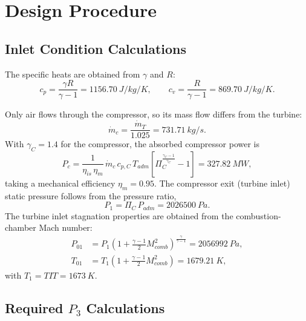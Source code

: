 \section{Design Procedure}

\subsection{Inlet Condition Calculations}

The specific heats are obtained from $\gamma$ and $R$:
\begin{equation}
    c_p = \frac{\gamma R}{\gamma-1} = \SI{1156.70}{J/kg/K},\qquad
    c_v = \frac{R}{\gamma-1} = \SI{869.70}{J/kg/K}.
\end{equation}

Only air flows through the compressor, so its mass flow differs from the turbine:
\begin{equation}
    \dot m_c = \frac{\dot m_T}{1.025} = \SI{731.71}{kg/s}.
\end{equation}
With $\gamma_C = 1.4$ for the compressor, the absorbed compressor power is
\begin{equation}
    P_c = \frac{1}{\eta_{is}\,\eta_m}\,\dot m_c\,c_{p,C}\,T_{adm}
          \left[\Pi_C^{\frac{\gamma_C-1}{\gamma_C}}-1\right] = \SI{327.82}{MW},
\end{equation}
taking a mechanical efficiency $\eta_m = 0.95$. The compressor exit (turbine
inlet) static pressure follows from the pressure ratio,
\begin{equation}
    P_1 = \Pi_C \, P_{adm} = \SI{2026500}{Pa}.
\end{equation}
The turbine inlet stagnation properties are obtained from the combustion-chamber
Mach number:
\begin{align}
    P_{01} &= P_1\left(1+\tfrac{\gamma-1}{2}M_{comb}^2\right)^{\frac{\gamma}{\gamma-1}}
            = \SI{2056992}{Pa},\\
    T_{01} &= T_1\left(1+\tfrac{\gamma-1}{2}M_{comb}^2\right)
            = \SI{1679.21}{K},
\end{align}
with $T_1 = TIT = \SI{1673}{K}$.

\subsection{Required \texorpdfstring{$P_3$}{P3} Calculations}

